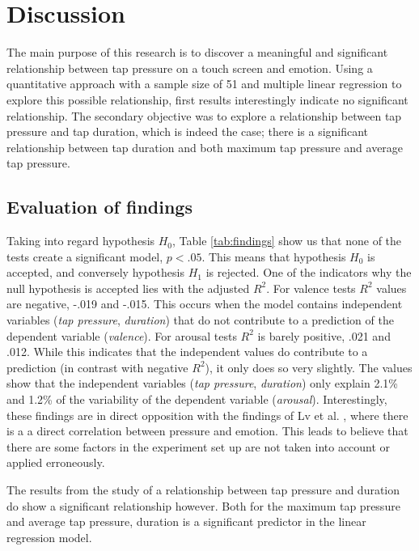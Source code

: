 \documentclass{sigchi}
\begin{document}
\section{Discussion} %
\label{sec:discussion}
The main purpose of this research is to discover a meaningful and significant relationship between tap pressure on a touch screen and emotion. Using a quantitative approach with a sample size of 51 and multiple linear regression to explore this possible relationship, first results interestingly indicate no significant relationship. The secondary objective was to explore a relationship between tap pressure and tap duration, which is indeed the case; there is a significant relationship between tap duration and both maximum tap pressure and average tap pressure. 

\subsection{Evaluation of findings} %
\label{sub:evaluation_of_findings}
Taking into regard hypothesis $H_0$, Table \ref{tab:findings} show us that none of the tests create a significant model, $p < .05$. This means that hypothesis $H_0$ is accepted, and conversely hypothesis $H_1$ is rejected. One of the indicators why the null hypothesis is accepted lies with the adjusted $R^2$. For valence tests $R^2$ values are negative, -.019 and -.015. This occurs when the model contains independent variables (\textit{tap pressure}, \textit{duration}) that do not contribute to a prediction of the dependent variable (\textit{valence}). For arousal tests $R^2$ is barely positive, .021 and .012. While this indicates that the independent values do contribute to a prediction (in contrast with negative $R^2$), it only does so very slightly. The values show that the independent variables (\textit{tap pressure}, \textit{duration}) only explain 2.1\% and 1.2\% of the variability of the dependent variable (\textit{arousal}). Interestingly, these findings are in direct opposition with the findings of Lv et al. \cite{H.R.LvZ.L.LinW.J.Yin2008} , where there is a a direct correlation between pressure and emotion. This leads to believe that there are some factors in the experiment set up are not taken into account or applied erroneously.

The results from the study of a relationship between tap pressure and duration do show a significant relationship however. Both for the maximum tap pressure and average tap pressure, duration is a significant predictor in the linear regression model.
\end{document}
